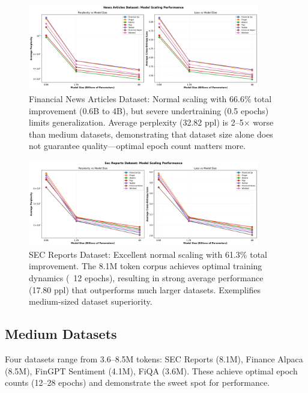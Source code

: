 \begin{figure}[h]
\centering
\includegraphics[width=0.9\textwidth]{figures/scaling_news_articles.png}
\caption[Financial News Dataset: Scaling Behavior]{Financial News Articles Dataset: Normal scaling with 66.6\% total improvement (0.6B to 4B), but severe undertraining (0.5 epochs) limits generalization. Average perplexity (32.82 ppl) is 2–5$\times$ worse than medium datasets, demonstrating that dataset size alone does not guarantee quality—optimal epoch count matters more.}
\label{fig:scaling_news_articles}
\end{figure}

\begin{figure}[h]
\centering
\includegraphics[width=0.9\textwidth]{figures/scaling_sec_reports.png}
\caption[SEC Reports Dataset: Scaling Behavior]{SEC Reports Dataset: Excellent normal scaling with 61.3\% total improvement. The 8.1M token corpus achieves optimal training dynamics (~12 epochs), resulting in strong average performance (17.80 ppl) that outperforms much larger datasets. Exemplifies medium-sized dataset superiority.}
\label{fig:scaling_sec_reports}
\end{figure}





\subsection{Medium Datasets}

Four datasets range from 3.6–8.5M tokens: SEC Reports (8.1M), Finance Alpaca (8.5M), FinGPT Sentiment (4.1M), FiQA (3.6M). These achieve optimal epoch counts (12–28 epochs) and demonstrate the sweet spot for performance.

